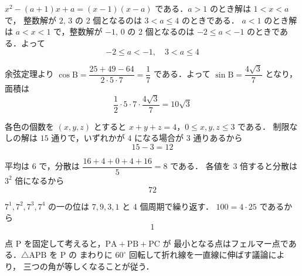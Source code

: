 \documentclass[lualatex,paper=b5j,fontsize=10pt,twoside]{jlreq}
\begin{document}

\begin{mmproblems}
  \item $x^2-(a+1)x+a=(x-1)(x-a)$ である．$a>1$ のとき解は $1<x<a$ で，
    整数解が $2,\,3$ の 2 個となるのは $3<a\leq 4$ のときである．
    $a<1$ のとき解は $a<x<1$ で，整数解が $-1,\,0$ の 2 個となるのは
    $-2\leq a<-1$ のときである．よって
    \[
      -2\leq a<-1,\quad 3<a\leq 4
    \]

  \item 余弦定理より $\cos\mathrm{B}=\dfrac{25+49-64}{2\cdot 5\cdot 7}=\dfrac{1}{7}$
    である．よって $\sin\mathrm{B}=\dfrac{4\sqrt{3}}{7}$ となり，面積は
    \[
      \dfrac{1}{2}\cdot 5\cdot 7\cdot\dfrac{4\sqrt{3}}{7}=10\sqrt{3}
    \]

  \item 各色の個数を $(x,y,z)$ とすると $x+y+z=4$，$0\leq x,y,z\leq 3$ である．
    制限なしの解は $15$ 通りで，いずれかが $4$ になる場合が $3$ 通りあるから
    \[
      15-3=12
    \]

  \item 平均は $6$ で，分散は $\dfrac{16+4+0+4+16}{5}=8$ である．
    各値を $3$ 倍すると分散は $3^2$ 倍になるから
    \[
      72
    \]

  \item $7^1,7^2,7^3,7^4$ の一の位は $7,9,3,1$ と 4 個周期で繰り返す．
    $100=4\cdot 25$ であるから
    \[
      1
    \]

  \item 点 $\mathrm{P}$ を固定して考えると，$\mathrm{PA}+\mathrm{PB}+\mathrm{PC}$ が
    最小となる点はフェルマー点である．$\triangle\mathrm{APB}$ を $\mathrm{P}$ の
    まわりに $60^\circ$ 回転して折れ線を一直線に伸ばす議論により，
    三つの角が等しくなることが従う．
\end{mmproblems}
\end{document}
